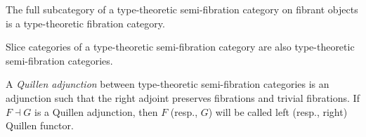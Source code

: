 \documentclass[reqno]{amsart}
\theoremstyle{definition}
\theoremstyle{remark}
\numberwithin{figure}{section}
\begin{document}
\begin{remark}
The full subcategory of a type-theoretic semi-fibration category on fibrant objects is a type-theoretic fibration category.
\end{remark}

\begin{remark}
Slice categories of a type-theoretic semi-fibration category are also type-theoretic semi-fibration categories.
\end{remark}

\begin{defn}
A \emph{Quillen adjunction} between type-theoretic semi-fibration categories is an adjunction such that the right adjoint preserves fibrations and trivial fibrations.
If $F \dashv G$ is a Quillen adjunction, then $F$ (resp., $G$) will be called left (resp., right) Quillen functor.
\end{defn}
\end{document}
